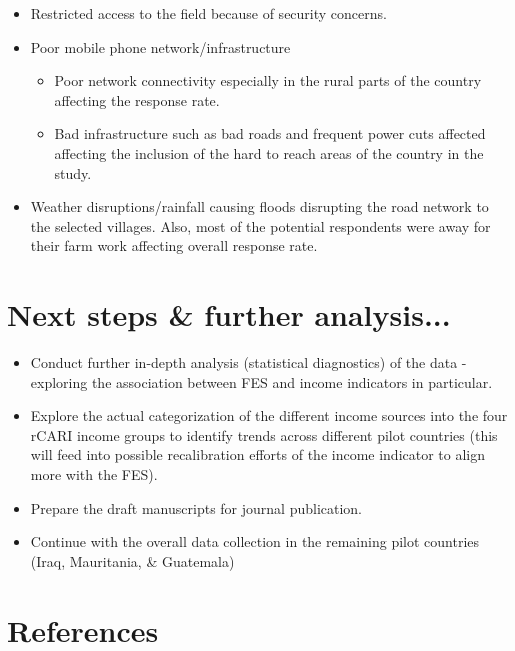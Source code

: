 \documentclass[11pt,harvard]{article}
\begin{document}
	\begin{itemize}[label=--, left=2.5em]
		\item[1.] Restricted access to the field because of security concerns.
		\item[2.] Poor mobile phone network/infrastructure 
		\begin{itemize}[label=--, left=1.75em]
			\item[a.]	Poor network connectivity especially in the rural parts of the country affecting the response rate.
			\item[b.]	Bad infrastructure such as bad roads and frequent power cuts affected affecting the inclusion of the hard to reach areas of the country in the study.
		\end{itemize}
		\item[3.] Weather disruptions/rainfall causing floods disrupting the road network to the selected villages. Also, most of the potential respondents were away for their farm work affecting overall response rate.
	\end{itemize}
	
	\pagebreak
	
	\section{Next steps \& further analysis...}
	
	\begin{itemize}[label=--, left=2.5em]
		\item[1.] Conduct further in-depth analysis (statistical diagnostics)  of the data - exploring the association between FES and income indicators in particular.
		\item[2.] Explore the actual categorization of the different income sources into the four rCARI income groups to identify trends across different pilot countries (this will feed into possible recalibration efforts of the income indicator to align more with the FES).
		\item[3.] Prepare the draft manuscripts for  journal publication.	
		\item[4.] Continue with the overall data collection in the remaining pilot countries (Iraq, Mauritania, \& Guatemala)
	\end{itemize} 
	
	
	\pagebreak
	
	
	\section{References}
	
\end{document}
